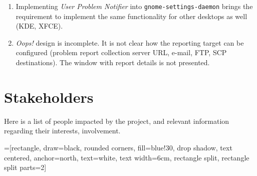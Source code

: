 \documentclass{article}
\begin{document}
\begin{enumerate}
\item Implementing \emph{User Problem Notifier} into
  \texttt{gnome-settings-daemon} brings the requirement to implement
  the same functionality for other desktops as well (KDE, XFCE).
\item \emph{Oops!} design is incomplete. It is not clear how the
  reporting target can be configured (problem report collection server
  URL, e-mail, FTP, SCP destinations).  The window with report details
  is not presented.
\end{enumerate}

\vfill
\section{Stakeholders}

Here is a list of people impacted by the project, and relevant
information regarding their interests, involvement.

=[rectangle, draw=black, rounded corners, fill=blue!30, drop shadow, text centered, anchor=north, text=white, text width=6cm, rectangle split, rectangle split parts=2]
\end{document}
